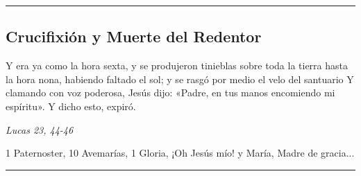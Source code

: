 \documentclass[11pt,a4paper]{book}
\begin{document}
    \rule{\textwidth}{0.5pt}
    

    \subsection*{Crucifixión y Muerte del Redentor}

    Y era ya como la hora sexta, y se produjeron tinieblas sobre toda la tierra hasta la hora nona, 
    habiendo faltado el sol; y se rasgó por medio el velo del santuario Y clamando con voz poderosa, 
    Jesús dijo: «Padre, en tus manos encomiendo mi espíritu». Y dicho esto, expiró.

    \begin{flushright}
        \emph{Lucas 23, 44-46}
    \end{flushright}    

    1 Paternoster, 10 Avemarías, 1 Gloria, ¡Oh Jesús mío! y María, Madre de gracia...

    \rule{\textwidth}{0.5pt}
\end{document}
